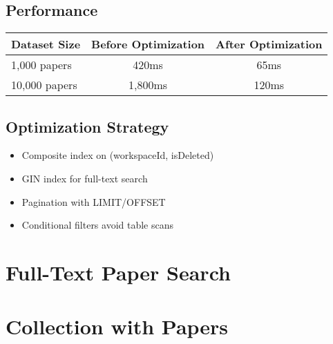 \subsection{Performance}
\begin{table}[H]
\centering
\begin{tabular}{@{}lcc@{}}
\toprule
\textbf{Dataset Size} & \textbf{Before Optimization} & \textbf{After Optimization} \\
\midrule
1,000 papers & 420ms & 65ms \\
10,000 papers & 1,800ms & 120ms \\
\bottomrule
\end{tabular}
\end{table}

\subsection{Optimization Strategy}
\begin{itemize}
    \item Composite index on (workspaceId, isDeleted)
    \item GIN index for full-text search
    \item Pagination with LIMIT/OFFSET
    \item Conditional filters avoid table scans
\end{itemize}



\section{Full-Text Paper Search}
\label{sec:query-fulltext-search}


\section{Collection with Papers}
\label{sec:query-collection-papers}


